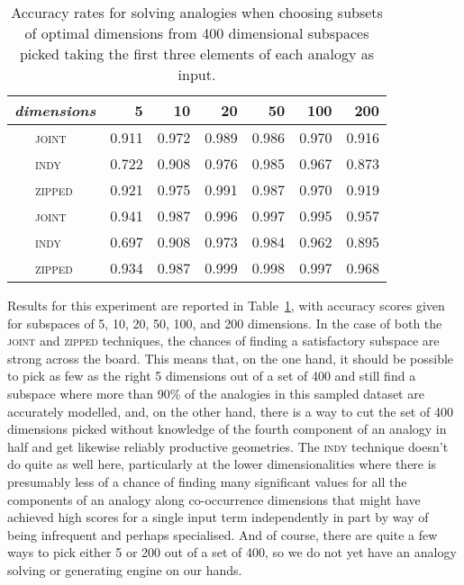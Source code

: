 \begin{table}
\centering
\begin{tabular}{clrrrrrr}
\hline
\multicolumn{2}{l}{\emph{dimensions}} & 5 & 10 & 20 & 50 & 100 & 200 \\
\hline
\parbox[t]{2mm}{} & \textsc{joint} & 0.911 & 0.972 & 0.989 & 0.986 & 0.970 & 0.916 \\
& \textsc{indy} & 0.722 & 0.908 & 0.976 & 0.985 & 0.967 & 0.873 \\
& \textsc{zipped} & 0.921 & 0.975 & 0.991 & 0.987 & 0.970 & 0.919 \\
\hline
\parbox[t]{2mm}{} & \textsc{joint} & 0.941 & 0.987 & 0.996 & 0.997 & 0.995 & 0.957 \\
& \textsc{indy} & 0.697 & 0.908 & 0.973 & 0.984 & 0.962 & 0.895 \\
& \textsc{zipped} & 0.934 & 0.987 & 0.999 & 0.998 & 0.997 & 0.968 \\
\hline
\end{tabular}
\caption[Finding Spaces for Known Analogies]{Accuracy rates for solving analogies when choosing subsets of optimal dimensions from 400 dimensional subspaces picked taking the first three elements of each analogy as input.}
\label{tab:knowns}
\end{table}

Results for this experiment are reported in Table~\ref{tab:knowns}, with accuracy scores given for subspaces of 5, 10, 20, 50, 100, and 200 dimensions.  In the case of both the \textsc{joint} and \textsc{zipped} techniques, the chances of finding a satisfactory subspace are strong across the board.  This means that, on the one hand, it should be possible to pick as few as the right 5 dimensions out of a set of 400 and still find a subspace where more than 90\% of the analogies in this sampled dataset are accurately modelled, and, on the other hand, there is a way to cut the set of 400 dimensions picked without knowledge of the fourth component of an analogy in half and get likewise reliably productive geometries.  The \textsc{indy} technique doesn't do quite as well here, particularly at the lower dimensionalities where there is presumably less of a chance of finding many significant values for all the components of an analogy along co-occurrence dimensions that might have achieved high scores for a single input term independently in part by way of being infrequent and perhaps specialised.  And of course, there are quite a few ways to pick either 5 or 200 out of a set of 400, so we do not yet have an analogy solving or generating engine on our hands.

